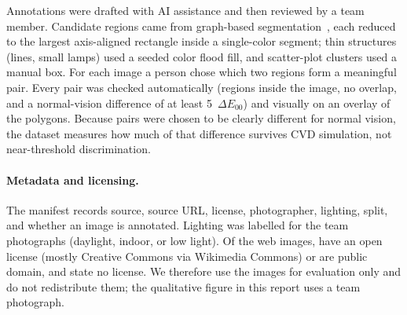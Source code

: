Annotations were drafted with AI assistance and then reviewed by a team member. Candidate
regions came from graph-based segmentation~\cite{felzenszwalb2004}, each reduced to the largest
axis-aligned rectangle inside a single-color segment; thin structures (lines, small lamps)
used a seeded color flood fill, and scatter-plot clusters used a manual box. For each image a
person chose which two regions form a meaningful pair. Every pair was checked automatically
(regions inside the image, no overlap, and a normal-vision difference of at least
5~$\Delta E_{00}$) and visually on an overlay of the polygons. Because pairs were chosen to be
clearly different for normal vision, the dataset measures how much of that difference survives
CVD simulation, not near-threshold discrimination.

\paragraph{Metadata and licensing.}
The manifest records source, source URL, license, photographer, lighting, split, and whether
an image is annotated. Lighting was labelled for the team photographs (daylight, indoor, or
low light). Of the \NumWebImages{} web images, \NumOpenLicense{} have an open license (mostly Creative
Commons via Wikimedia Commons) or are public domain, and \NumNoLicense{} state no license. We therefore use the images for evaluation only and do
not redistribute them; the qualitative figure in this report uses a team photograph.

